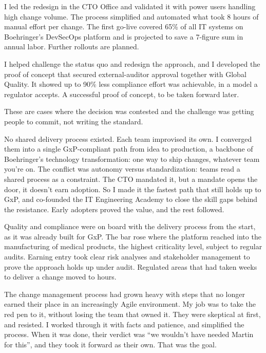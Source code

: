 \documentclass[11pt, a4paper]{awesome-cv}
\begin{document}
{ I led the redesign in the CTO Office and validated it with power users handling high change volume. The process simplified and automated what took 8 hours of manual effort per change. The first go-live covered 65\% of all IT systems on Boehringer's DevSecOps platform and is projected to save a 7-figure sum in annual labor. Further rollouts are planned.

 I helped challenge the status quo and redesign the approach, and I developed the proof of concept that secured external-auditor approval together with Global Quality. It showed up to 90\% less compliance effort was achievable, in a model a regulator accepts. A successful proof of concept, to be taken forward later.


These are cases where the decision was contested and the challenge was getting people to commit, not writing the standard.

 No shared delivery process existed. Each team improvised its own. I converged them into a single GxP-compliant path from idea to production, a backbone of Boehringer's technology transformation: one way to ship changes, whatever team you're on. The conflict was autonomy versus standardization: teams read a shared process as a constraint. The CTO mandated it, but a mandate opens the door, it doesn't earn adoption. So I made it the fastest path that still holds up to GxP, and co-founded the IT Engineering Academy to close the skill gaps behind the resistance. Early adopters proved the value, and the rest followed.

 Quality and compliance were on board with the delivery process from the start, as it was already built for GxP. The bar rose where the platform reached into the manufacturing of medical products, the highest criticality level, subject to regular audits. Earning entry took clear risk analyses and stakeholder management to prove the approach holds up under audit. Regulated areas that had taken weeks to deliver a change moved to hours.

 The change management process had grown heavy with steps that no longer earned their place in an increasingly Agile environment. My job was to take the red pen to it, without losing the team that owned it. They were skeptical at first, and resisted. I worked through it with facts and patience, and simplified the process. When it was done, their verdict was ``we wouldn't have needed Martin for this'', and they took it forward as their own. That was the goal.

}
\end{document}
